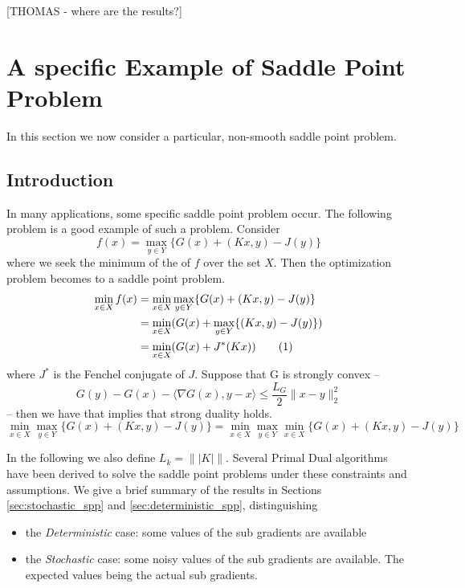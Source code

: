 \documentclass[12pt,reqno]{amsart}
\numberwithin{equation}{section}
\newcommand\numberthis{\addtocounter{equation}{1}\tag{\theequation}}
\begin{document}
[THOMAS - where are the results?]

\section{ A specific Example of Saddle Point Problem}

In this section we now consider a particular, non-smooth saddle point problem.

\subsection{Introduction}
In many applications, some specific saddle point problem occur. The following problem is a good example of such a problem. Consider
$$
f(x) = \max_{y \in Y} \{ G(x) + (Kx,y) - J(y) \} 
$$
where we seek the minimum of the of $f$ over the set $X$. Then the optimization problem becomes to a saddle point problem.
\begin{align*}
\min_{x \in X} f(x) &= \min_{x \in X}\max_{y \in Y} \{ G(x) + (Kx,y) - J(y)\} \\
&= \min_{x \in X} (G(x) + \max_{y \in Y} \{  (Kx,y) - J(y)\})\\
&= \min_{x \in X} (G(x) + J^{*}(Kx)) \numberthis \label{SPPpart} 
\end{align*}
where $J^{*}$ is the Fenchel conjugate of $J$. Suppose that G is strongly convex -- 
$$
G(y) - G(x) - \langle \nabla G(x),y - x\rangle \leq \dfrac{L_{G}}{2} \lVert x - y \rVert_{2}^{2}
$$
-- then we have that implies that strong duality holds.
$$
\min_{x \in X}\max_{y \in Y} \{ G(x) + (Kx,y) - J(y)\} = \min_{x \in X}\max_{y \in Y}\min_{x \in X} \{ G(x) + (Kx,y) - J(y)\}
$$

In the following we also define $\boxed{ L_{k} = \lVert| K |\rVert }$. Several Primal Dual algorithms have been derived to solve the saddle point problems under these constraints and assumptions. We give a brief summary of the results in Sections \ref{sec:stochastic_spp} and \ref{sec:deterministic_spp}, distinguishing
\begin{itemize}
\item the \emph{Deterministic} case: some values of the sub gradients are available
\item the \emph{Stochastic} case:  some noisy values of the sub gradients are available. 
The expected values being the actual sub gradients.
\end{itemize}
\end{document}
